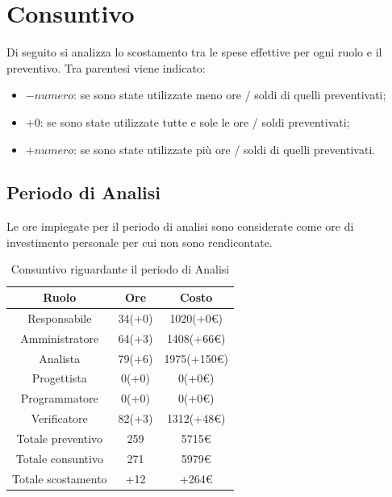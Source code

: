 \section{Consuntivo}
Di seguito si analizza lo scostamento tra le spese effettive per ogni ruolo e il preventivo. Tra parentesi viene indicato:
\begin{itemize}
	\item $-numero$: se sono state utilizzate meno ore / soldi di quelli preventivati;
	\item $+0$: se sono state utilizzate tutte e sole le ore / soldi preventivati;
	\item $+numero$: se sono state utilizzate più ore / soldi di quelli preventivati.
\end{itemize}
\subsection{Periodo di Analisi}
Le ore impiegate per il periodo di analisi sono considerate come ore di investimento personale per cui non sono rendicontate.
\begin{table}[H]
	\centering
	\renewcommand{\arraystretch}{1.5}
	\begin{tabular}{|c|c|c|}
		\hline
		\rowcolor{lighter-grayer}
Ruolo & Ore & Costo \\ \hline
Responsabile & 34(+0) & 1020(+0\euro) \\ \hline
Amministratore & 64(+3) & 1408(+66\euro) \\ \hline
Analista & 79(+6) & 1975(+150\euro) \\ \hline
Progettista & 0(+0) & 0(+0\euro) \\ \hline
Programmatore & 0(+0) & 0(+0\euro) \\ \hline
Verificatore & 82(+3) & 1312(+48\euro) \\ \hline
Totale preventivo & 259 & 5715\euro \\ \hline
Totale consuntivo & 271 & 5979\euro \\ \hline
Totale scostamento & +12 & +264\euro \\ \hline
	\end{tabular}
	\caption{ Consuntivo riguardante il periodo di Analisi\\}
\end{table}
